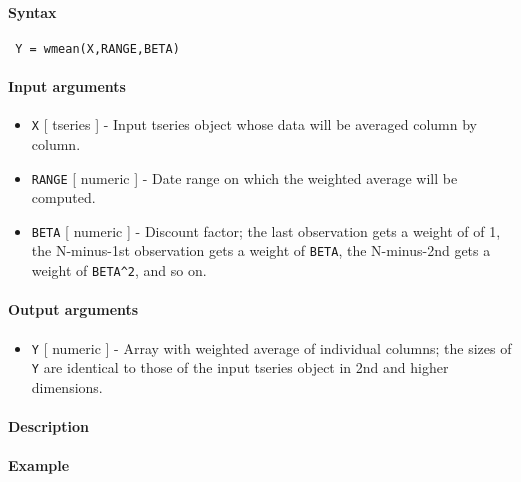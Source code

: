 


	\paragraph{Syntax}
 
 \begin{verbatim}
 Y = wmean(X,RANGE,BETA)
 \end{verbatim}
 
 \paragraph{Input arguments}
 
 \begin{itemize}
 \item
   \texttt{X} {[} tseries {]} - Input tseries object whose data will be
   averaged column by column.
 \item
   \texttt{RANGE} {[} numeric {]} - Date range on which the weighted
   average will be computed.
 \item
   \texttt{BETA} {[} numeric {]} - Discount factor; the last observation
   gets a weight of of 1, the N-minus-1st observation gets a weight of
   \texttt{BETA}, the N-minus-2nd gets a weight of \texttt{BETA\^{}2},
   and so on.
 \end{itemize}
 
 \paragraph{Output arguments}
 
 \begin{itemize}
 \item
   \texttt{Y} {[} numeric {]} - Array with weighted average of individual
   columns; the sizes of \texttt{Y} are identical to those of the input
   tseries object in 2nd and higher dimensions.
 \end{itemize}
 
 \paragraph{Description}
 
 \paragraph{Example}


